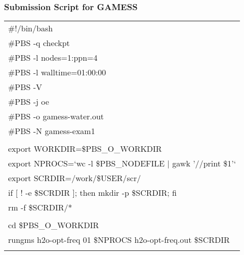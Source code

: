 \documentclass[slidestop,mathserif,compress,xcolor=svgnames]{beamer}
\newenvironment{eblock}[0]
{
\begin{beamerboxesrounded}[upper=uppercol2,lower=lowercol2,shadow=true]}
{\end{beamerboxesrounded}}
\begin{document}
\begin{frame}
  \frametitle{\small Submission Script for GAMESS}
  \begin{eblock}{}
    \begin{tabular}{l}
      \#!/bin/bash\\
      \#PBS -q checkpt\\
      \#PBS -l nodes=1:ppn=4\\
      \#PBS -l walltime=01:00:00\\
      \#PBS -V\\
      \#PBS -j oe\\
      \#PBS -o gamess-water.out\\
      \#PBS -N gamess-exam1\\
      \\
      export WORKDIR=\$PBS\_O\_WORKDIR\\
      export NPROCS=`wc -l \$PBS\_NODEFILE | gawk '//{print \$1}'`\\
      export SCRDIR=/work/\$USER/scr/\\
      if [ ! -e \$SCRDIR ]; then mkdir -p \$SCRDIR; fi\\
      rm -f \$SCRDIR/*\\
      \\
      cd \$PBS\_O\_WORKDIR\\
      rungms h2o-opt-freq 01 \$NPROCS h2o-opt-freq.out \$SCRDIR\\
      \\      
    \end{tabular}
  \end{eblock}
\end{frame}
\end{document}
